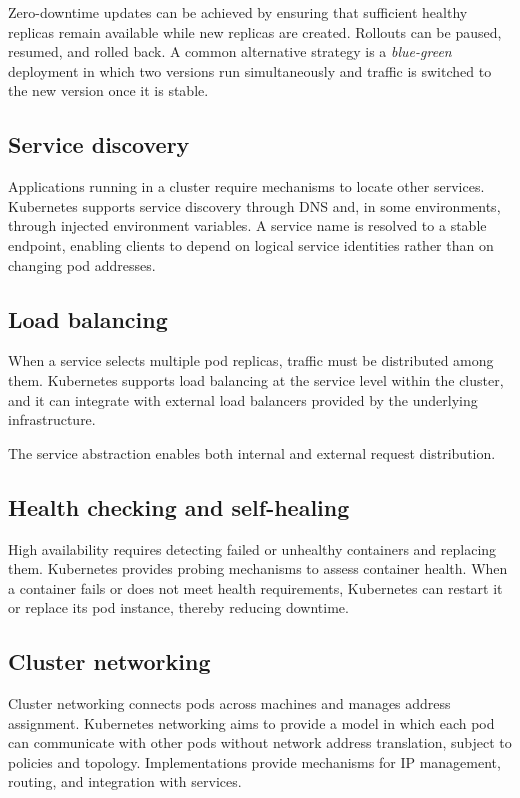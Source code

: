 \documentclass[11pt,a4paper,openany]{report}
\begin{document}
Zero-downtime updates can be achieved by ensuring that sufficient healthy replicas remain available while new replicas are created. Rollouts can be paused, resumed, and rolled back. A common alternative strategy is a \emph{blue-green} deployment in which two versions run simultaneously and traffic is switched to the new version once it is stable.

\subsection{Service discovery}

Applications running in a cluster require mechanisms to locate other services. Kubernetes supports service discovery through DNS and, in some environments, through injected environment variables. A service name is resolved to a stable endpoint, enabling clients to depend on logical service identities rather than on changing pod addresses.

\subsection{Load balancing}

When a service selects multiple pod replicas, traffic must be distributed among them. Kubernetes supports load balancing at the service level within the cluster, and it can integrate with external load balancers provided by the underlying infrastructure.

The service abstraction enables both internal and external request distribution.

\subsection{Health checking and self-healing}

High availability requires detecting failed or unhealthy containers and replacing them. Kubernetes provides probing mechanisms to assess container health. When a container fails or does not meet health requirements, Kubernetes can restart it or replace its pod instance, thereby reducing downtime.

\subsection{Cluster networking}

Cluster networking connects pods across machines and manages address assignment. Kubernetes networking aims to provide a model in which each pod can communicate with other pods without network address translation, subject to policies and topology. Implementations provide mechanisms for IP management, routing, and integration with services.
\end{document}

